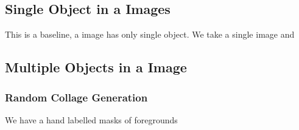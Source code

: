 \documentclass{article}
\begin{document}
\subsection{Single Object in a Images}
This is a baseline, a image has only single object. We take a single image and 

\subsection{Multiple Objects in a Image}
\label{sec:GeneratingCollage}

\subsubsection{Random Collage Generation}
We have a hand labelled masks of foregrounds 
\end{document}
